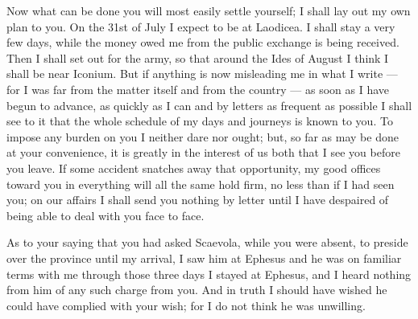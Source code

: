  Now what can be done you will most easily settle yourself; I shall lay out my own plan to you. On the 31st of July I expect to be at Laodicea. I shall stay a very few days, while the money owed me from the public exchange is being received. Then I shall set out for the army, so that around the Ides of August I think I shall be near Iconium. But if anything is now misleading me in what I write --- for I was far from the matter itself and from the country --- as soon as I have begun to advance, as quickly as I can and by letters as frequent as possible I shall see to it that the whole schedule of my days and journeys is known to you. To impose any burden on you I neither dare nor ought; but, so far as may be done at your convenience, it is greatly in the interest of us both that I see you before you leave. If some accident snatches away that opportunity, my good offices toward you in everything will all the same hold firm, no less than if I had seen you; on our affairs I shall send you nothing by letter until I have despaired of being able to deal with you face to face.

 As to your saying that you had asked Scaevola, while you were absent, to preside over the province until my arrival, I saw him at Ephesus and he was on familiar terms with me through those three days I stayed at Ephesus, and I heard nothing from him of any such charge from you. And in truth I should have wished he could have complied with your wish; for I do not think he was unwilling.
